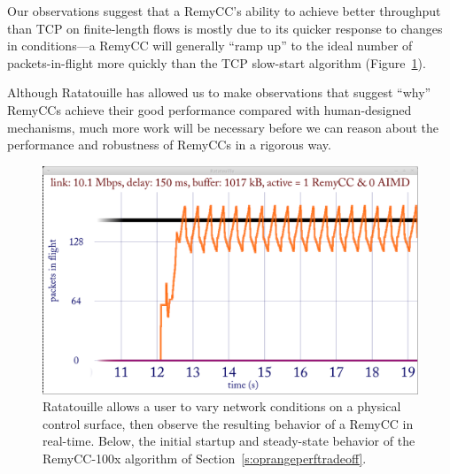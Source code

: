 Our observations suggest that a RemyCC's ability to achieve better
throughput than TCP on finite-length flows is mostly due to its
quicker response to changes in conditions---a RemyCC will generally
``ramp up'' to the ideal number of packets-in-flight more quickly than
the TCP slow-start algorithm (Figure~\ref{fig:ratscreen}).

Although Ratatouille has allowed us to make observations that suggest
``why'' RemyCCs achieve their good performance compared with
human-designed mechanisms, much more work will be necessary before we
can reason about the performance and robustness of RemyCCs in a
rigorous way.

\begin{figure}
\caption{Ratatouille allows a user to vary network conditions on a
  physical control surface, then observe the resulting behavior of a
  RemyCC in real-time. Below, the initial startup and steady-state
  behavior of the RemyCC-100x algorithm of Section~\ref{s:oprangeperftradeoff}.}
\label{fig:ratscreen}

\begin{center}

\includegraphics[width=0.85 \textwidth]{ratatouille.png}

\end{center}
\end{figure}
